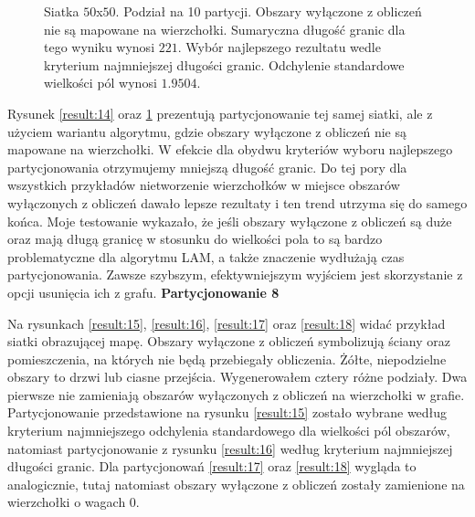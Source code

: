 \begin{figure}[h]
\begin{subfigure}{.33\textwidth}
    \caption[short]{}
\end{subfigure}
\caption{Siatka $50$x$50$. Podział na 10 partycji.
Obszary wyłączone z obliczeń nie są mapowane na wierzchołki.
Sumaryczna długość granic dla tego wyniku wynosi $221$.
Wybór najlepszego rezultatu wedle kryterium najmniejszej długości granic.
Odchylenie standardowe wielkości pól wynosi $1.9504$.}
\label{result:13}
\end{figure}
Rysunek \ref{result:14} oraz \ref{result:13} prezentują partycjonowanie tej samej siatki, ale z użyciem wariantu algorytmu,
gdzie obszary wyłączone z obliczeń nie są mapowane na wierzchołki.
W efekcie dla obydwu kryteriów wyboru najlepszego partycjonowania otrzymujemy mniejszą długość granic.
Do tej pory dla wszystkich przykładów nietworzenie wierzchołków w miejsce obszarów wyłączonych z obliczeń
dawało lepsze rezultaty i ten trend utrzyma się do samego końca.
Moje testowanie wykazało, że jeśli obszary wyłączone z obliczeń są duże oraz mają długą granicę w stosunku do wielkości pola to są bardzo
problematyczne dla algorytmu LAM, a także znaczenie wydłużają czas partycjonowania.
Zawsze szybszym, efektywniejszym wyjściem jest skorzystanie z opcji usunięcia ich z grafu.
\FloatBarrier
\vspace{3mm}
\textbf{Partycjonowanie 8}
\vspace{1mm}

Na rysunkach \ref{result:15}, \ref{result:16}, \ref{result:17} oraz \ref{result:18} widać przykład siatki obrazującej
mapę.
Obszary wyłączone z obliczeń symbolizują ściany oraz pomieszczenia, na których nie będą przebiegały obliczenia.
Żółte, niepodzielne obszary to drzwi lub ciasne przejścia.
Wygenerowałem cztery różne podziały.
Dwa pierwsze nie zamieniają obszarów wyłączonych z obliczeń na wierzchołki w grafie.
Partycjonowanie przedstawione na rysunku \ref{result:15} zostało wybrane według kryterium najmniejszego odchylenia standardowego dla wielkości pól obszarów,
natomiast partycjonowanie z rysunku \ref{result:16} według kryterium najmniejszej długości granic.
Dla partycjonowań \ref{result:17} oraz \ref{result:18} wygląda to analogicznie, tutaj natomiast obszary wyłączone z obliczeń
zostały zamienione na wierzchołki o wagach $0$.

